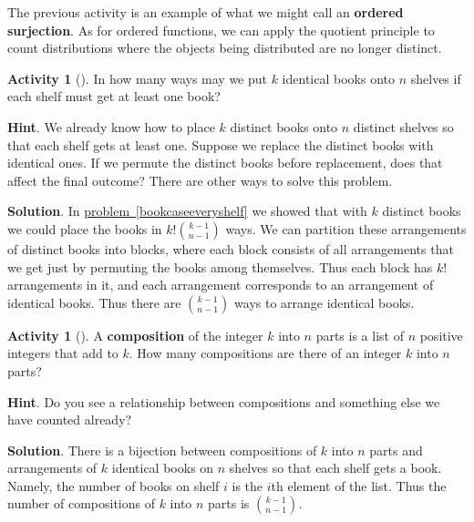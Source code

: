 \documentclass[10pt,]{book}
\newcommand{\terminology}[1]{\textbf{#1}}
\theoremstyle{plain}
\theoremstyle{definition}
\theoremstyle{definition}
\theoremstyle{definition}
\newtheorem{activity}[project]{Activity}
\theoremstyle{definition}
\numberwithin{equation}{chapter}
\begin{document}
The previous activity is an example of what we might call an \terminology{ordered surjection}.  As for ordered functions, we can apply the quotient principle to count distributions where the objects being distributed are no longer distinct.%
\begin{activity}[]\label{activity-70}
\hypertarget{p-764}{}%
In how many ways may we put \(k\) identical books onto \(n\) shelves if each shelf must get at least one book?%
\par\smallskip%
\noindent\textbf{Hint}.\hypertarget{hint-62}{}\quad%
\hypertarget{p-765}{}%
We already know how to place \(k\) distinct books onto \(n\) distinct shelves so that each shelf gets at least one. Suppose we replace the distinct books with identical ones. If we permute the distinct books before replacement, does that affect the final outcome? There are other ways to solve this problem.%
\par\smallskip%
\noindent\textbf{Solution}.\hypertarget{solution-71}{}\quad%
\hypertarget{p-766}{}%
In \hyperref[bookcaseeveryshelf]{problem~\ref{bookcaseeveryshelf}} we showed that with \(k\) distinct books we could place the books in \(k!\binom{k-1}{n-1}\) ways. We can partition these arrangements of distinct books into blocks, where each block consists of all arrangements that we get just by permuting the books among themselves. Thus each block has \(k!\) arrangements in it, and each arrangement corresponds to an arrangement of identical books. Thus there are \(\binom{k-1}{n-1}\) ways to arrange identical books.%
\end{activity}
\begin{activity}[]\label{compositionagian}
\hypertarget{p-767}{}%
A \terminology{composition} of the integer \(k\) into \(n\) parts is a list of \(n\) positive integers that add to \(k\).  How many compositions are there of an integer \(k\) into \(n\) parts?%
\par\smallskip%
\noindent\textbf{Hint}.\hypertarget{hint-63}{}\quad%
\hypertarget{p-768}{}%
Do you see a relationship between compositions and something else we have counted already?%
\par\smallskip%
\noindent\textbf{Solution}.\hypertarget{solution-72}{}\quad%
\hypertarget{p-769}{}%
There is a bijection between compositions of \(k\) into \(n\) parts and arrangements of \(k\) identical books on \(n\) shelves so that each shelf gets a book. Namely, the number of books on shelf \(i\) is the \(i\)th element of the list. Thus the number of compositions of \(k\) into \(n\) parts is \(\binom{k-1}{n-1}\).%
\end{activity}
\end{document}
